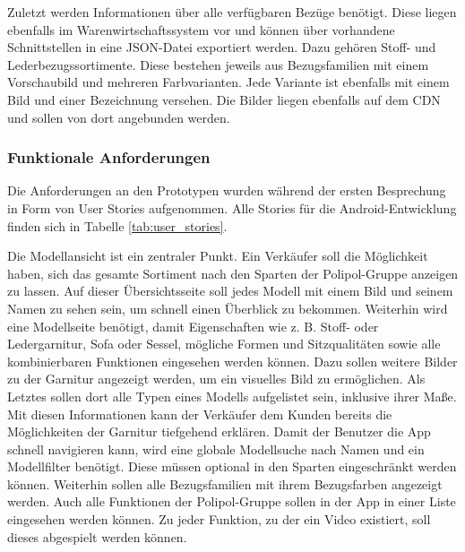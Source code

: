 Zuletzt werden Informationen über alle verfügbaren Bezüge benötigt. Diese liegen ebenfalls im Warenwirtschaftssystem vor und können über vorhandene Schnittstellen in eine \gls{JSON}-Datei exportiert werden. Dazu gehören Stoff- und Lederbezugssortimente. Diese bestehen jeweils aus Bezugsfamilien mit einem Vorschaubild und mehreren Farbvarianten. Jede Variante ist ebenfalls mit einem Bild und einer Bezeichnung versehen. Die Bilder liegen ebenfalls auf dem \gls{CDN} und sollen von dort angebunden werden.

\FloatBarrier
\subsubsection{Funktionale Anforderungen}
\label{sec:funktionale_anforderungen}

Die Anforderungen an den Prototypen wurden während der ersten Besprechung in Form von User Stories aufgenommen. Alle Stories für die Android-Entwicklung finden sich in Tabelle \ref{tab:user_stories}.

Die Modellansicht ist ein zentraler Punkt. Ein Verkäufer soll die Möglichkeit haben, sich das gesamte Sortiment nach den Sparten der Polipol-Gruppe anzeigen zu lassen. Auf dieser Übersichtsseite soll jedes Modell mit einem Bild und seinem Namen zu sehen sein, um schnell einen Überblick zu bekommen. Weiterhin wird eine Modellseite benötigt, damit Eigenschaften wie z. B. Stoff- oder Ledergarnitur, Sofa oder Sessel, mögliche Formen und Sitzqualitäten sowie alle kombinierbaren Funktionen eingesehen werden können. Dazu sollen weitere Bilder zu der Garnitur angezeigt werden, um ein visuelles Bild zu ermöglichen. Als Letztes sollen dort alle Typen eines Modells aufgelistet sein, inklusive ihrer Maße. Mit diesen Informationen kann der Verkäufer dem Kunden bereits die Möglichkeiten der Garnitur tiefgehend erklären. Damit der Benutzer die App schnell navigieren kann, wird eine globale Modellsuche nach Namen und ein Modellfilter benötigt. Diese müssen optional in den Sparten eingeschränkt werden können. Weiterhin sollen alle Bezugsfamilien mit ihrem Bezugsfarben angezeigt werden. Auch alle Funktionen der Polipol-Gruppe sollen in der App in einer Liste eingesehen werden können. Zu jeder Funktion, zu der ein Video existiert, soll dieses abgespielt werden können.

